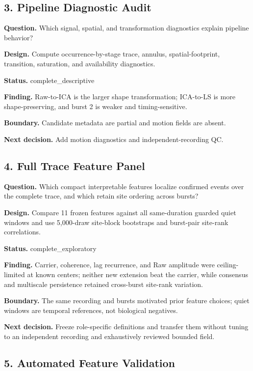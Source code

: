 \subsection{3. Pipeline Diagnostic Audit}

\textbf{Question.} Which signal, spatial, and transformation diagnostics explain pipeline behavior?

\textbf{Design.} Compute occurrence-by-stage trace, annulus, spatial-footprint, transition, saturation, and availability diagnostics.

\textbf{Status.} complete\_descriptive

\textbf{Finding.} Raw-to-ICA is the larger shape transformation; ICA-to-LS is more shape-preserving, and burst 2 is weaker and timing-sensitive.

\textbf{Boundary.} Candidate metadata are partial and motion fields are absent.

\textbf{Next decision.} Add motion diagnostics and independent-recording QC.

\subsection{4. Full Trace Feature Panel}

\textbf{Question.} Which compact interpretable features localize confirmed events over the complete trace, and which retain site ordering across bursts?

\textbf{Design.} Compare 11 frozen features against all same-duration guarded quiet windows and use 5,000-draw site-block bootstraps and burst-pair site-rank correlations.

\textbf{Status.} complete\_exploratory

\textbf{Finding.} Carrier, coherence, lag recurrence, and Raw amplitude were ceiling-limited at known centers; neither new extension beat the carrier, while consensus and multiscale persistence retained cross-burst site-rank variation.

\textbf{Boundary.} The same recording and bursts motivated prior feature choices; quiet windows are temporal references, not biological negatives.

\textbf{Next decision.} Freeze role-specific definitions and transfer them without tuning to an independent recording and exhaustively reviewed bounded field.

\subsection{5. Automated Feature Validation}

